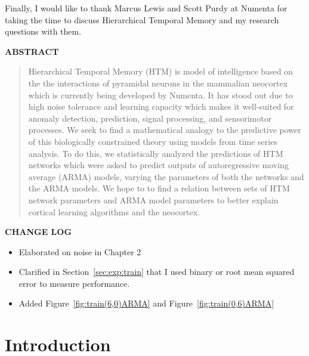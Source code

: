 \documentclass[oneside,12pt,openany]{book}
\begin{document}
	Finally, I would like to thank Marcus Lewis and Scott Purdy at Numenta for taking the time to discuss Hierarchical Temporal Memory and my research questions with them.
	\vfill
	\pagebreak
	
	\begin{center}
		\textbf{ABSTRACT}
		
		\begin{quotation}
			\noindent Hierarchical Temporal Memory (HTM) is model of intelligence based on the the interactions of pyramidal neurons in the mammalian neocortex which is currently being developed by Numenta. It has stood out due to high noise tolerance and learning capacity which makes it well-suited for anomaly detection, prediction, signal processing, and sensorimotor processes. We seek to find a mathematical analogy to the predictive power of this biologically constrained theory using models from time series analysis. To do this, we statistically analyzed the predictions of HTM networks which were asked to predict outputs of autoregressive moving average (ARMA) models, varying the parameters of both the networks and the ARMA models. We hope to to find a relation between sets of HTM network parameters and ARMA model parameters to better explain cortical learning algorithms and the neocortex.
		\end{quotation}

		
	\end{center}
	\vfill
	\pagebreak
	
	\textbf{CHANGE LOG}
	\begin{itemize}[noitemsep]
        \item Elaborated on noise in Chapter 2
		\item Clarified in Section~\ref{sec:exp:train} that I used binary or root mean squared error to measure performance.
		\item Added Figure~\ref{fig:train(6,0)ARMA} and Figure~\ref{fig:train(0,6)ARMA}
	\end{itemize}
	\vfill
	\pagebreak
	\vfill
	\pagebreak
	\setcounter{tocdepth}{1}
	\listoffigures
	\vfill
	\pagebreak
	
	\listoftables
	\vfill

	\pagebreak
	
	\mainmatter
	\chapter{Introduction}
	
\end{document}
